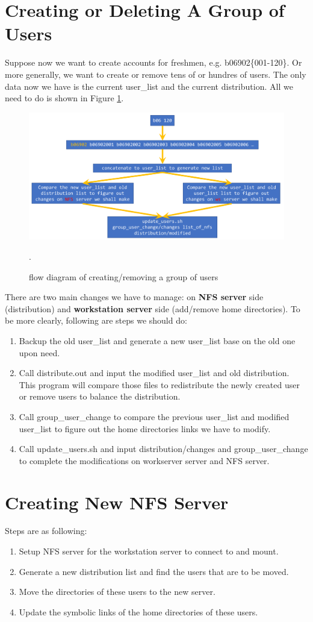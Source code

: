\documentclass{article}
\begin{document}
\section{Creating or Deleting A Group of Users}
Suppose now we want to create accounts for freshmen, e.g. b06902\{001-120\}. 
Or more generally, we want to create or remove tens of or hundres of users.
The only data now we have is the current user\_list and the current distribution.
All we need to do is shown in Figure \ref{userChange}.
\begin{figure}[h]
\centering
\includegraphics[width=\textwidth]{Fig2.png}
\caption{flow diagram of creating/removing a group of users}
\label{userChange}.
\end{figure}
There are two main changes we have to manage: on {\bf NFS server} side (distribution) and {\bf workstation server} side
(add/remove home directories). To be more clearly, following are steps we should do:
   \begin{enumerate}
   \item Backup the old user\_list and generate a new user\_list base on the old one upon need.
   \item Call {\cs distribute.out} and input the modified user\_list and old distribution.
   This program will compare those files to redistribute the newly created user or remove users to balance the distribution.
   \item Call {\cs group\_user\_change} to compare the previous user\_list and modified user\_list to figure out
   the home directories links we have to modify.
   \item Call {\cs update\_users.sh} and input distribution/changes and group\_user\_change to complete the modifications on workserver server and NFS server.
   \end{enumerate}

\section{Creating New NFS Server}
Steps are as following:
   \begin{enumerate}
   \item Setup NFS server for the workstation server to connect to and mount.
   \item Generate a new distribution list and find the users that are to be moved.
   \item Move the directories of these users to the new server.
   \item Update the symbolic links of the home directories of these users.
   \end{enumerate}
\end{document}
